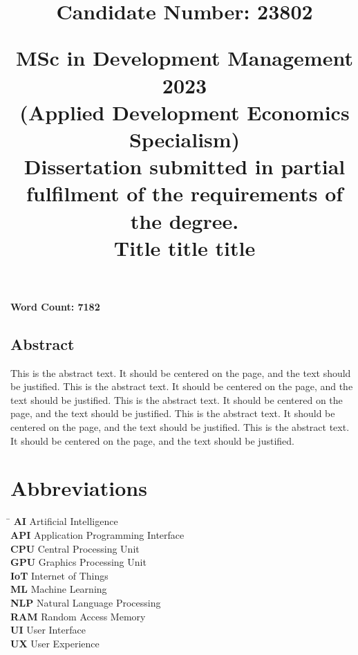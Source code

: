 \documentclass[12pt]{article}%
\title{
        \begin{flushright}
        \large \textbf{Candidate Number: 23802}
        \end{flushright}
        \vspace*{30mm}
        \begin{center}
        \large MSc in Development Management 2023 \\
        \large (Applied Development Economics Specialism) \\
        \vspace*{5mm}
        Dissertation submitted in partial fulfilment of the requirements of the degree. \\
        \vspace*{35mm}
        \Huge \textbf{Title title title} \\
        \vspace*{20mm}
        \end{center}
    }%
\date{}%
\begin{document}
%
\normalsize%
%
\pagestyle{frontmatter}%
\maketitle%

\vfill
\begin{center}\textbf{Word Count: 7182}\end{center}
\newpage%
\vspace*{\fill}%
\begin{center}%
\begin{minipage}{0.8\textwidth}%
\begin{center}%
\section*{Abstract}%
\end{center}%
\justify%
This is the abstract text. It should be centered on the page, and the text should be justified. This is the abstract text. It should be centered on the page, and the text should be justified. This is the abstract text. It should be centered on the page, and the text should be justified. This is the abstract text. It should be centered on the page, and the text should be justified. This is the abstract text. It should be centered on the page, and the text should be justified. %
\end{minipage}%
\end{center}%
\vspace*{\fill}%
\newpage%
\tableofcontents%
\newpage%
\section*{Abbreviations}%
\label{sec:Abbreviations}%
\begin{tabbing}%
\hspace{3cm} \= \kill%
\textbf{AI} \> Artificial Intelligence \\%
\textbf{API} \> Application Programming Interface \\%
\textbf{CPU} \> Central Processing Unit \\%
\textbf{GPU} \> Graphics Processing Unit \\%
\textbf{IoT} \> Internet of Things \\%
\textbf{ML} \> Machine Learning \\%
\textbf{NLP} \> Natural Language Processing \\%
\textbf{RAM} \> Random Access Memory \\%
\textbf{UI} \> User Interface \\%
\textbf{UX} \> User Experience \\%
\end{tabbing}
\end{document}
